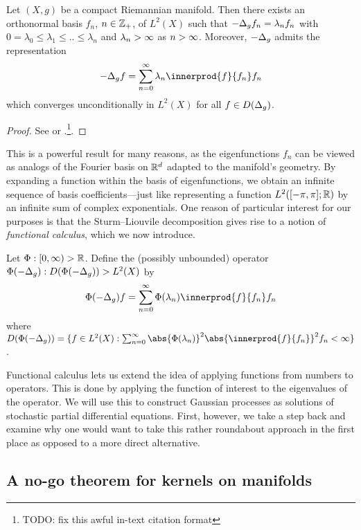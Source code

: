 \documentclass[11pt]{book}
\begin{document}
\begin{result}
Let $(X,g)$ be a compact Riemannian manifold.
Then there exists an orthonormal basis $f_n$, $n\in\mathbb{Z}_+$, of $L^2(X)$ such that $-\Delta_g f_n = \lambda_n f_n$ with $0 = \lambda_0 \leq \lambda_1 \leq .. \leq \lambda_n$ and $\lambda_n\-> \infty$ as $n\->\infty$.
Moreover, $-\Delta_g$ admits the representation
\[
-\lap_g f = \sum_{n=0}^\infty \lambda_n \innerprod{f}{f_n} f_n
\]
which converges unconditionally in $L^2(X)$ for all $f \in D(\Delta_g)$.
\end{result}

\begin{proof}
See \textcite[page 139]{chavel84} or \textcite[Theorem 44]{canzani13}.\footnote{TODO: fix this awful in-text citation format}.
\end{proof}

This is a powerful result for many reasons, as the eigenfunctions $f_n$ can be viewed as analogs of the Fourier basis  on $\mathbb{R}^d$ adapted to the manifold's geometry.
By expanding a function within the basis of eigenfunctions, we obtain an infinite sequence of basis coefficients---just like representing a function $L^2([-\pi,\pi];\mathbb{R})$ by an infinite sum of complex exponentials.
One reason of particular interest for our purposes is that the Sturm--Liouvile decomposition gives rise to a notion of \emph{functional calculus}, which we now introduce.

\begin{definition}
Let $\Phi : [0,\infty) \-> \mathbb{R}$. 
Define the (possibly unbounded) operator $\Phi(-\Delta_g) : D(\Phi(-\Delta_g)) \-> L^2(X)$ by
\[
\Phi(-\lap_g) f = \sum_{n=0}^\infty \Phi(\lambda_n) \innerprod{f}{f_n} f_n
\]
where $D(\Phi(-\lap_g)) = \{f \in L^2(X) : \sum_{n=0}^\infty \abs{\Phi(\lambda_n)}^2 \abs{\innerprod{f}{f_n}}^2 f_n < \infty\}$.
\end{definition}

Functional calculus lets us extend the idea of applying functions from numbers to operators.
This is done by applying the function of interest to the eigenvalues of the operator.
We will use this to construct Gaussian processes as solutions of stochastic partial differential equations.
First, however, we take a step back and examine why one would want to take this rather roundabout approach in the first place as opposed to a more direct alternative.

\subsection{A no-go theorem for kernels on manifolds}
\end{document}
